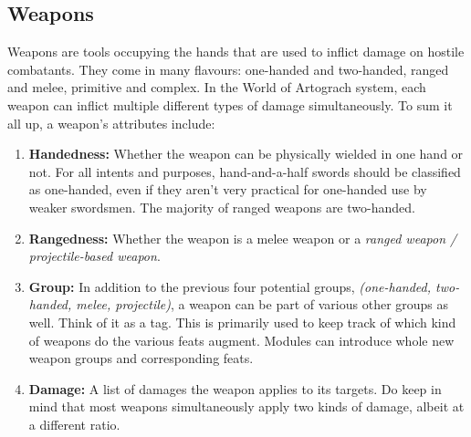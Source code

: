 \documentclass[openany,11pt,a4paper]{book}
\begin{document}
\subsection{Weapons}
Weapons are tools occupying the hands that are used to inflict damage on hostile combatants. They come in many flavours: one-handed and two-handed, ranged and melee, primitive and complex. In the World of Artograch system, each weapon can inflict multiple different types of damage simultaneously. To sum it all up, a weapon's attributes include:
\begin{enumerate}
  \item \textbf{Handedness:} Whether the weapon can be physically wielded in one hand or not. For all intents and purposes, hand-and-a-half swords should be classified as one-handed, even if they aren't very practical for one-handed use by weaker swordsmen. The majority of ranged weapons are two-handed.
  \item \textbf{Rangedness:} Whether the weapon is a melee weapon or a \textit{ranged weapon / projectile-based weapon}.
  \item \textbf{Group:} In addition to the previous four potential groups, \textit{(one-handed, two-handed, melee, projectile)}, a weapon can be part of various other groups as well. Think of it as a tag. This is primarily used to keep track of which kind of weapons do the various feats augment. Modules can introduce whole new weapon groups and corresponding feats.
  \item \textbf{Damage:} A list of damages the weapon applies to its targets. Do keep in mind that most weapons simultaneously apply two kinds of damage, albeit at a different ratio.
\end{enumerate}
\end{document}
